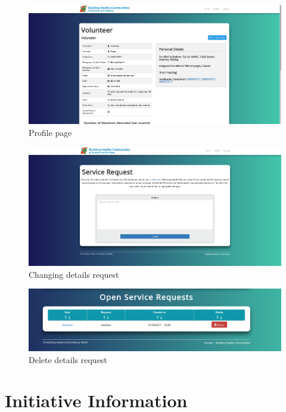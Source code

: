 \documentclass{bhcguides}
\begin{document}
\begin{figure}[h]
 \centerline{\includegraphics[width=\textwidth, height=\textheight, keepaspectratio]{profilepage.png}}
 \caption{Profile page}
 \label{fig:profilePage}
\end{figure}

\begin{figure}[h]
 \centerline{\includegraphics[width=\textwidth, height=\textheight, keepaspectratio]{detailchange.png}}
 \caption{Changing details request}
 \label{fig:detailChange}
\end{figure}

\begin{figure}[h]
 \centerline{\includegraphics[width=\textwidth, height=\textheight, keepaspectratio]{deleteRequest.png}}
 \caption{Delete details request}
 \label{fig:detailDelete}
\end{figure}

\section{Initiative Information}
\label{sec:initiatives}
\end{document}
